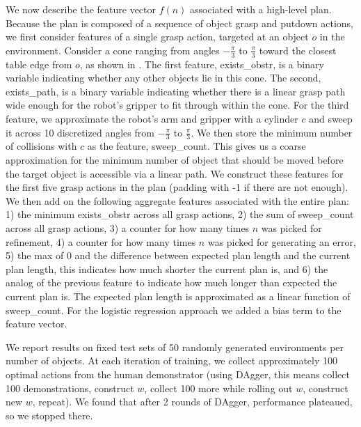 We now describe the feature vector $f(n)$ associated with a high-level plan. Because the plan is composed
of a sequence of object grasp and putdown actions, we first consider features of a single grasp action, targeted
at an object $o$ in the environment. Consider a cone ranging from angles $-\frac{\pi}{3}$ to $\frac{\pi}{3}$
toward the closest table edge from $o$, as shown in . The first feature, exists\_obstr, is a binary variable indicating
whether any other objects lie in this cone. The second, exists\_path, is a binary variable indicating whether there is a linear
grasp path wide enough for the robot's gripper to fit through within the cone. For the third feature, we approximate the robot's arm and gripper with a cylinder $c$ and sweep it across 10 discretized angles from $-\frac{\pi}{3}$ to
$\frac{\pi}{3}$. We then store the minimum number of collisions with $c$ as the feature, sweep\_count. This gives us a coarse approximation for the minimum number of object that should be moved before the target object is accessible via a linear path.
We construct these features for the first five grasp actions in the plan (padding with -1 if there are not enough).
We then add on the following aggregate features associated with the entire plan: 1) the minimum exists\_obstr across all grasp actions,
2) the sum of sweep\_count across all grasp actions, 3) a counter for how many times $n$ was picked for refinement,
4) a counter for how many times $n$ was picked for generating an error,
5) the max of 0 and the difference between expected plan length and the current plan length, this indicates how much shorter the current plan is, and 6) the analog of the previous feature to indicate how much longer than expected the current plan is. The expected plan length is approximated as a linear function of sweep\_count. For the logistic regression approach we added a bias term to the feature vector.

We report results on fixed test sets of 50 randomly generated environments per number of objects. At each
iteration of training, we collect approximately 100 optimal actions from the human demonstrator (using
DAgger, this means collect 100 demonstrations, construct $w$, collect 100 more while rolling out $w$, construct new $w$, repeat).
We found that after 2 rounds of DAgger, performance plateaued, so we stopped there.

